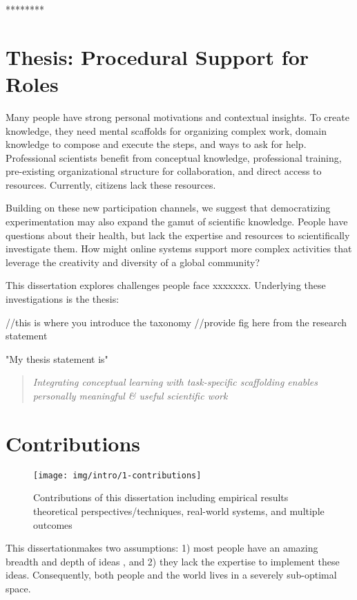 ********
\section{Thesis: Procedural Support for Roles}

Many people have strong personal motivations and contextual insights. To create knowledge,
they need mental scaffolds for organizing complex work, domain knowledge to compose and
execute the steps, and ways to ask for help. Professional scientists benefit from conceptual
knowledge, professional training, pre-existing organizational structure for collaboration, and direct access to resources. Currently, citizens lack these resources.

Building on these new participation channels, we suggest that democratizing experimentation may
also expand the gamut of scientific knowledge. People have questions about their health, but lack
the expertise and resources to scientifically investigate them. How might online systems support
more complex activities that leverage the creativity and diversity of a global community?

This dissertation explores challenges people face xxxxxxx. Underlying these investigations is the thesis:

//this is where you introduce the taxonomy 
//provide fig here from the research statement 

"My thesis statement is"
\begin{quote}
\emph{Integrating conceptual learning with task-specific scaffolding enables personally meaningful \& useful scientific work}
\end{quote}


\section{Contributions}
\begin{figure}[t!] 
  \centering
    \texttt{[image: img/intro/1-contributions]}
  \caption[Contributions of this dissertation]
{Contributions of this dissertation including empirical results theoretical perspectives/techniques, real-world systems, and multiple outcomes}
  \label{fig:contributions}
\end{figure}

This dissertation\textquotesingle makes two assumptions: 1) most people have an amazing breadth and depth of ideas , and 2) they lack the expertise to implement these ideas. Consequently, both people and the world lives in a severely sub-optimal space.

